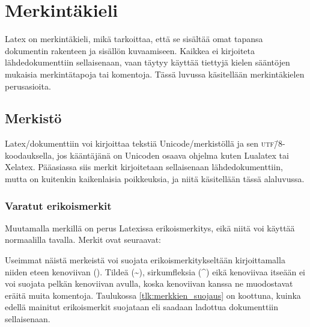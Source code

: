 
\chapter{Merkintäkieli}

Latex on merkintäkieli, mikä tarkoittaa, että se sisältää omat tapansa
dokumentin rakenteen ja sisällön kuvaamiseen. Kaikkea ei kirjoiteta
lähdedokumenttiin sellaisenaan, vaan täytyy käyttää tiettyjä kielen
sääntöjen mukaisia merkintätapoja tai komentoja. Tässä luvussa
käsitellään merkintäkielen perus\-asioita.

\section{Merkistö}

Latex\-/dokumenttiin voi kirjoittaa tekstiä Unicode\-/merkistöllä ja sen
\textsc{utf}\=/8\/-koodauksella, jos kääntäjänä on Unicoden osaava
ohjelma kuten Lualatex tai Xelatex. Pääasiassa siis merkit kirjoitetaan
sellaisenaan lähdedokumenttiin, mutta on kuitenkin kaikenlaisia
poikkeuksia, ja niitä käsitellään tässä alaluvussa.

\subsection{Varatut erikoismerkit}

Muutamalla merkillä on perus Latexissa erikoismerkitys, eikä niitä voi
käyttää normaalilla tavalla. Merkit ovat seuraavat:

\begin{koodilohkosis}
\end{koodilohkosis}

Useimmat näistä merkeistä voi suojata erikoismerkitykseltään
kirjoittamalla niiden eteen kenoviivan (\koodi{\keno}). Tildeä
(\textasciitilde), sirkumfleksia (\textasciicircum) eikä kenoviivaa
itseään ei voi suojata pelkän kenoviivan avulla, koska kenoviivan kanssa
ne muodostavat eräitä muita komentoja. Taulukossa
\ref{tlk:merkkien_suojaus} on koottuna, kuinka edellä mainitut
erikoismerkit suojataan eli saadaan ladottua dokumenttiin sellaisenaan.

